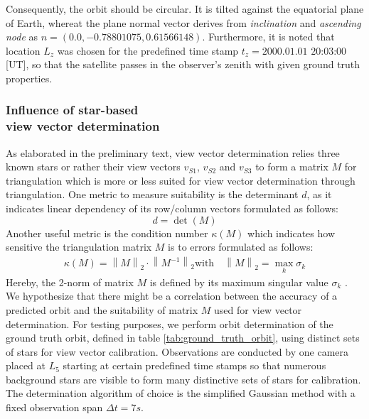 \documentclass[10pt,a4paper]{article}
\begin{document}
	\noindent
	Consequently, the orbit should be circular. It is tilted against the equatorial plane of Earth, whereat the plane normal vector derives from \emph{inclination} and \emph{ascending node} as $n=(0.0, -0.78801075, 0.61566148)$.\newline
	Furthermore, it is noted that location $L_z$ was chosen for the predefined time stamp $t_z = \text{2000.01.01 20:03:00}$ [UT], so that the satellite passes in the observer's zenith with given ground truth properties.
	
	\subsubsection{Influence of star-based \\ view vector determination}
	As elaborated in the preliminary text, view vector determination relies three known stars or rather their view vectors $v_{S1}$, $v_{S2}$ and $v_{S3}$ to form a matrix $M$ for triangulation \cite{orbit_determination_preliminary} which is more or less suited for view vector determination through triangulation. One metric to measure suitability is the determinant $d$, as it indicates linear dependency of its row/column vectors formulated as follows:
	\begin{equation}\label{eq:determinant}
		d = \det(M)
	\end{equation} 
	\noindent
	Another useful metric is the condition number $\kappa(M)$ which indicates how sensitive the triangulation matrix $M$ is to errors formulated as follows:
	\begin{equation}
		\begin{aligned}
			\kappa(M) = \left\lVert M \right\rVert_2 \cdot \left\lVert M^{-1}\right\rVert_2 \text{with}\quad \left\lVert M \right\rVert_2 = \max_k \sigma_k
		\end{aligned}
	\end{equation}
	\noindent
	Hereby, the 2-norm of matrix $M$ is defined by its maximum singular value $\sigma_k$ \cite{condition_numbers}.\newline
	We hypothesize that there might be a correlation between the accuracy of a predicted orbit and the suitability of matrix $M$ used for view vector determination. For testing purposes, we perform orbit determination of the ground truth orbit,  defined in table \ref{tab:ground_truth_orbit}, using distinct sets of stars for view vector calibration. Observations are conducted by one camera placed at $L_5$ starting at certain predefined time stamps so that numerous background stars are visible to form many distinctive 
	sets of stars for calibration. The determination algorithm of choice is the simplified Gaussian method with a fixed observation span $\Delta t = 7s$.
	
\end{document}
